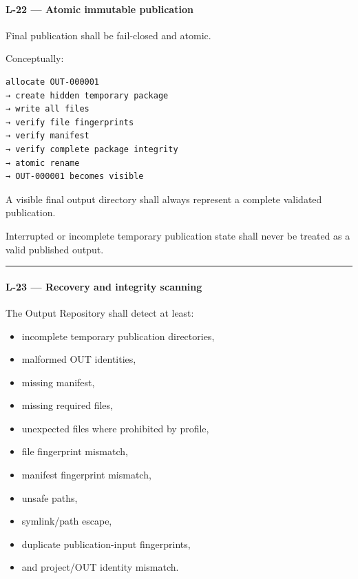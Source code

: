 \hypertarget{l-22--atomic-immutable-publication}{%
\paragraph{L-22 --- Atomic immutable publication}\label{l-22--atomic-immutable-publication}}

Final publication shall be fail-closed and atomic.

Conceptually:

\begin{verbatim}
allocate OUT-000001
→ create hidden temporary package
→ write all files
→ verify file fingerprints
→ verify manifest
→ verify complete package integrity
→ atomic rename
→ OUT-000001 becomes visible
\end{verbatim}

A visible final output directory shall always represent a complete validated publication.

Interrupted or incomplete temporary publication state shall never be treated as a valid published output.

\begin{center}\rule{0.5\linewidth}{0.5pt}\end{center}

\hypertarget{l-23--recovery-and-integrity-scanning}{%
\paragraph{L-23 --- Recovery and integrity scanning}\label{l-23--recovery-and-integrity-scanning}}

The Output Repository shall detect at least:

\begin{itemize}
\tightlist
\item
  incomplete temporary publication directories,
\item
  malformed OUT identities,
\item
  missing manifest,
\item
  missing required files,
\item
  unexpected files where prohibited by profile,
\item
  file fingerprint mismatch,
\item
  manifest fingerprint mismatch,
\item
  unsafe paths,
\item
  symlink/path escape,
\item
  duplicate publication-input fingerprints,
\item
  and project/OUT identity mismatch.
\end{itemize}

